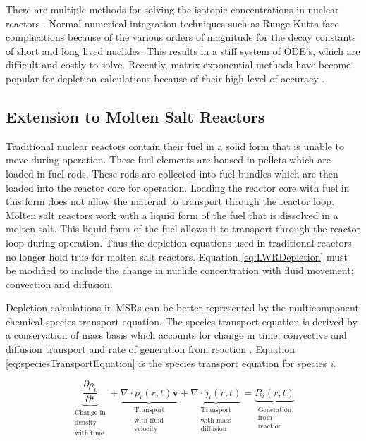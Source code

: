 There are multiple methods for solving the isotopic concentrations in nuclear reactors \cite{isotalo2011} \cite{pusa2010} \cite{akio2007}. Normal numerical integration techniques such as Runge Kutta face complications because of the various orders of magnitude for the decay constants of short and long lived nuclides. This results in a stiff system of ODE's, which are difficult and costly to solve. Recently, matrix exponential methods have become popular for depletion calculations because of their high level of accuracy \cite{pusaThesis} \cite{aarnoThesis}. 

\subsection{Extension to Molten Salt Reactors}
Traditional nuclear reactors contain their fuel in a solid form that is unable to move during operation. These fuel elements are housed in pellets which are loaded in fuel rods. These rods are collected into fuel bundles which are then loaded into the reactor core for operation. Loading the reactor core with fuel in this form does not allow the material to transport through the reactor loop. Molten salt reactors work with a liquid form of the fuel that is dissolved in a molten salt. This liquid form of the fuel allows it to transport through the reactor loop during operation. Thus the depletion equations used in traditional reactors no longer hold true for molten salt reactors. Equation \ref{eq:LWRDepletion} must be modified to include the change in nuclide concentration with fluid movement: convection and diffusion. 

Depletion calculations in MSRs can be better represented by the multicomponent chemical species transport equation. The species transport equation is derived by a conservation of mass basis which accounts for change in time, convective and diffusion transport and rate of generation from reaction \cite{bird2006}. Equation \ref{eq:speciesTransportEquation} is the species transport equation for species \textit{i}. 

\begin{equation}
    \underbrace{\frac{\partial \rho_{i}}{\partial t}}_{\substack{\text{Change in} \\
    \text{density} \\
    \text{with time}}} + 
    \underbrace{\nabla \cdot \rho_{i}(r,t)\boldsymbol{v}}_{\substack{\text{Transport} \\
    \text{with fluid} \\
    \text{velocity}}}
    + \underbrace{\nabla \cdot j_{i}(r,t)}_{\substack{\text{Transport} \\
    \text{with mass} \\
    \text{diffusion}}} = 
    \underbrace{R_{i}(r,t)}_{\substack{\text{Generation} \\
    \text{from} \\
    \text{reaction}}}
    \label{eq:speciesTransportEquation}
\end{equation}


